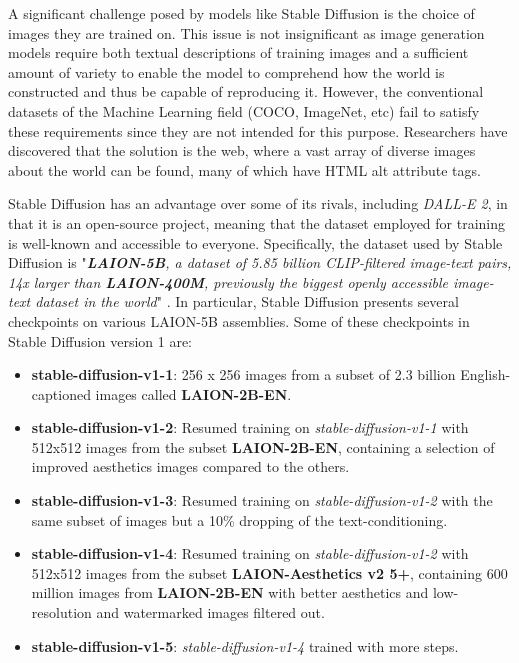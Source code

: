 A significant challenge posed by models like Stable Diffusion is the choice of images they are trained on. This issue is not insignificant as image generation models require both textual descriptions of training images and a sufficient amount of variety to enable the model to comprehend how the world is constructed and thus be capable of reproducing it. However, the conventional datasets of the Machine Learning field (COCO, ImageNet, etc) fail to satisfy these requirements since they are not intended for this purpose. Researchers have discovered that the solution is the web, where a vast array of diverse images about the world can be found, many of which have HTML alt attribute tags.

Stable Diffusion has an advantage over some of its rivals, including \textit{DALL-E 2}, in that it is an open-source project, meaning that the dataset employed for training is well-known and accessible to everyone. Specifically, the dataset used by Stable Diffusion is "\textit{\textbf{LAION-5B}, a dataset of 5.85 billion CLIP-filtered image-text pairs, 14x larger than \textbf{LAION-400M}, previously the biggest openly accessible image-text dataset in the world}" \cite{schuhmann2022laion}. In particular, Stable Diffusion presents several checkpoints on various LAION-5B assemblies. Some of these checkpoints in Stable Diffusion version 1 \cite{SDCardHF} are:

\begin{itemize}
  \item \textbf{stable-diffusion-v1-1}: 256 x 256 images from a subset of 2.3 billion English-captioned images called \textbf{LAION-2B-EN}.
  \item \textbf{stable-diffusion-v1-2}: Resumed training on \textit{stable-diffusion-v1-1} with 512x512 images from the subset \textbf{LAION-2B-EN}, containing a selection of improved aesthetics images compared to the others.
  \item \textbf{stable-diffusion-v1-3}: Resumed training on \textit{stable-diffusion-v1-2} with the same subset of images but a 10\% dropping of the text-conditioning.
  \item \textbf{stable-diffusion-v1-4}: Resumed training on \textit{stable-diffusion-v1-2} with 512x512 images from the subset \textbf{LAION-Aesthetics v2 5+}, containing 600 million images from \textbf{LAION-2B-EN} with better aesthetics and low-resolution and watermarked images filtered out.
  \item \textbf{stable-diffusion-v1-5}: \textit{stable-diffusion-v1-4} trained with more steps.
\end{itemize}

